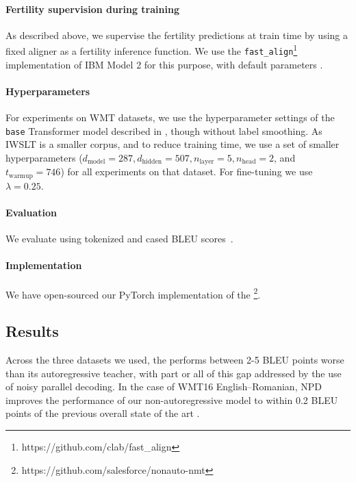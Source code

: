 \paragraph{Fertility supervision during training}
As described above, we supervise the fertility predictions at train time by using a fixed aligner as a fertility inference function. We use the \texttt{fast\_align}\footnote{https://github.com/clab/fast\_align} implementation of IBM Model 2 for this purpose, with default parameters
\citep{dyer2013simple}.


\paragraph{Hyperparameters}
For experiments on WMT datasets, we use the hyperparameter settings of the \texttt{base} Transformer model described in \citet{vaswani2017attention}, though without label smoothing. As IWSLT is a smaller corpus, and to reduce training time, we use a set of smaller hyperparameters ($d_{\text{model}}=287, d_{\text{hidden}}=507, n_{\text{layer}}=5, n_{\text{head}}=2$, and $t_\text{warmup}=746$) for all experiments on that dataset.
For fine-tuning we use $\lambda=0.25$.


\paragraph{Evaluation} We evaluate using tokenized and cased BLEU scores~\citep{papineni2002bleu}.

\paragraph{Implementation} We have open-sourced our PyTorch implementation of the \model{}\footnote{https://github.com/salesforce/nonauto-nmt}.

\subsection{Results}
Across the three datasets we used, the \model{} performs between 2-5 BLEU points worse than its autoregressive teacher, with part or all of this gap addressed by the use of noisy parallel decoding. In the case of WMT16 English--Romanian, NPD improves the performance of our non-autoregressive model to within 0.2 BLEU points of the previous overall state of the art \citep{gehring2017convolutional}.

